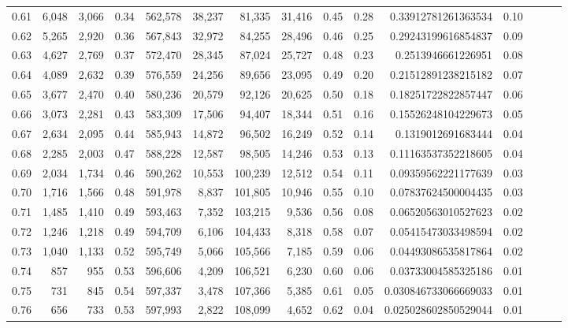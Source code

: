 \begin{tabular}{rrrrrrrrrrrrrrr}
0.61 &   6,048 &  3,066 &  0.34 &  562,578 &   38,237 &   81,335 &   31,416 &  0.45 &  0.28 &     0.33912781261363534 &      0.10 \\
0.62 &   5,265 &  2,920 &  0.36 &  567,843 &   32,972 &   84,255 &   28,496 &  0.46 &  0.25 &     0.29243199616854837 &      0.09 \\
0.63 &   4,627 &  2,769 &  0.37 &  572,470 &   28,345 &   87,024 &   25,727 &  0.48 &  0.23 &      0.2513946661226951 &      0.08 \\
0.64 &   4,089 &  2,632 &  0.39 &  576,559 &   24,256 &   89,656 &   23,095 &  0.49 &  0.20 &     0.21512891238215182 &      0.07 \\
0.65 &   3,677 &  2,470 &  0.40 &  580,236 &   20,579 &   92,126 &   20,625 &  0.50 &  0.18 &     0.18251722822857447 &      0.06 \\
0.66 &   3,073 &  2,281 &  0.43 &  583,309 &   17,506 &   94,407 &   18,344 &  0.51 &  0.16 &     0.15526248104229673 &      0.05 \\
0.67 &   2,634 &  2,095 &  0.44 &  585,943 &   14,872 &   96,502 &   16,249 &  0.52 &  0.14 &      0.1319012691683444 &      0.04 \\
0.68 &   2,285 &  2,003 &  0.47 &  588,228 &   12,587 &   98,505 &   14,246 &  0.53 &  0.13 &     0.11163537352218605 &      0.04 \\
0.69 &   2,034 &  1,734 &  0.46 &  590,262 &   10,553 &  100,239 &   12,512 &  0.54 &  0.11 &     0.09359562221177639 &      0.03 \\
0.70 &   1,716 &  1,566 &  0.48 &  591,978 &    8,837 &  101,805 &   10,946 &  0.55 &  0.10 &     0.07837624500004435 &      0.03 \\
0.71 &   1,485 &  1,410 &  0.49 &  593,463 &    7,352 &  103,215 &    9,536 &  0.56 &  0.08 &     0.06520563010527623 &      0.02 \\
0.72 &   1,246 &  1,218 &  0.49 &  594,709 &    6,106 &  104,433 &    8,318 &  0.58 &  0.07 &     0.05415473033498594 &      0.02 \\
0.73 &   1,040 &  1,133 &  0.52 &  595,749 &    5,066 &  105,566 &    7,185 &  0.59 &  0.06 &     0.04493086535817864 &      0.02 \\
0.74 &     857 &    955 &  0.53 &  596,606 &    4,209 &  106,521 &    6,230 &  0.60 &  0.06 &     0.03733004585325186 &      0.01 \\
0.75 &     731 &    845 &  0.54 &  597,337 &    3,478 &  107,366 &    5,385 &  0.61 &  0.05 &    0.030846733066669033 &      0.01 \\
0.76 &     656 &    733 &  0.53 &  597,993 &    2,822 &  108,099 &    4,652 &  0.62 &  0.04 &    0.025028602850529044 &      0.01 \\

\end{tabular}
